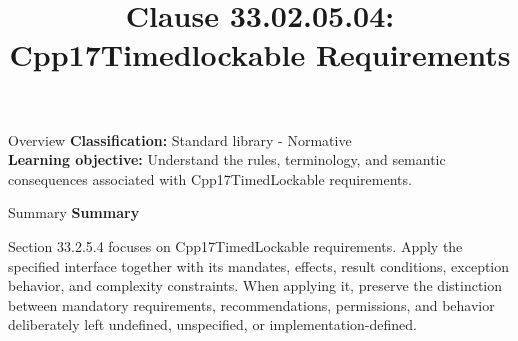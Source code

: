 \documentclass[10pt,letterpaper]{article}
\title{Clause 33.02.05.04: Cpp17Timedlockable Requirements}
\author{}
\date{}
\begin{document}
\maketitle
\begin{CornellOverviewBox}{Overview}
\textbf{Classification:} Standard library - Normative\\[2pt]
\textbf{Learning objective:} Understand the rules, terminology, and semantic consequences associated with Cpp17TimedLockable requirements.
\end{CornellOverviewBox}\begin{CornellSummaryBox}{Summary}
{\sffamily\bfseries\color{Accent} Summary}\par\vspace{3pt}Section 33.2.5.4 focuses on Cpp17TimedLockable requirements. Apply the specified interface together with its mandates, effects, result conditions, exception behavior, and complexity constraints. When applying it, preserve the distinction between mandatory requirements, recommendations, permissions, and behavior deliberately left undefined, unspecified, or implementation-defined.
\end{CornellSummaryBox}
\end{document}
